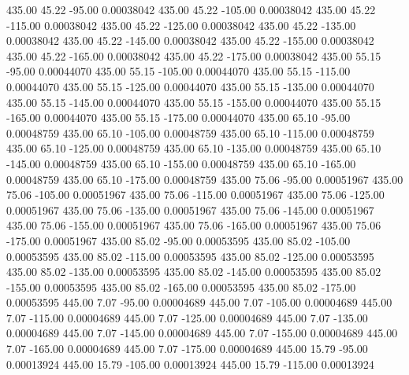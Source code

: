     435.00     45.22    -95.00     0.00038042
    435.00     45.22   -105.00     0.00038042
    435.00     45.22   -115.00     0.00038042
    435.00     45.22   -125.00     0.00038042
    435.00     45.22   -135.00     0.00038042
    435.00     45.22   -145.00     0.00038042
    435.00     45.22   -155.00     0.00038042
    435.00     45.22   -165.00     0.00038042
    435.00     45.22   -175.00     0.00038042
    435.00     55.15    -95.00     0.00044070
    435.00     55.15   -105.00     0.00044070
    435.00     55.15   -115.00     0.00044070
    435.00     55.15   -125.00     0.00044070
    435.00     55.15   -135.00     0.00044070
    435.00     55.15   -145.00     0.00044070
    435.00     55.15   -155.00     0.00044070
    435.00     55.15   -165.00     0.00044070
    435.00     55.15   -175.00     0.00044070
    435.00     65.10    -95.00     0.00048759
    435.00     65.10   -105.00     0.00048759
    435.00     65.10   -115.00     0.00048759
    435.00     65.10   -125.00     0.00048759
    435.00     65.10   -135.00     0.00048759
    435.00     65.10   -145.00     0.00048759
    435.00     65.10   -155.00     0.00048759
    435.00     65.10   -165.00     0.00048759
    435.00     65.10   -175.00     0.00048759
    435.00     75.06    -95.00     0.00051967
    435.00     75.06   -105.00     0.00051967
    435.00     75.06   -115.00     0.00051967
    435.00     75.06   -125.00     0.00051967
    435.00     75.06   -135.00     0.00051967
    435.00     75.06   -145.00     0.00051967
    435.00     75.06   -155.00     0.00051967
    435.00     75.06   -165.00     0.00051967
    435.00     75.06   -175.00     0.00051967
    435.00     85.02    -95.00     0.00053595
    435.00     85.02   -105.00     0.00053595
    435.00     85.02   -115.00     0.00053595
    435.00     85.02   -125.00     0.00053595
    435.00     85.02   -135.00     0.00053595
    435.00     85.02   -145.00     0.00053595
    435.00     85.02   -155.00     0.00053595
    435.00     85.02   -165.00     0.00053595
    435.00     85.02   -175.00     0.00053595
    445.00      7.07    -95.00     0.00004689
    445.00      7.07   -105.00     0.00004689
    445.00      7.07   -115.00     0.00004689
    445.00      7.07   -125.00     0.00004689
    445.00      7.07   -135.00     0.00004689
    445.00      7.07   -145.00     0.00004689
    445.00      7.07   -155.00     0.00004689
    445.00      7.07   -165.00     0.00004689
    445.00      7.07   -175.00     0.00004689
    445.00     15.79    -95.00     0.00013924
    445.00     15.79   -105.00     0.00013924
    445.00     15.79   -115.00     0.00013924
